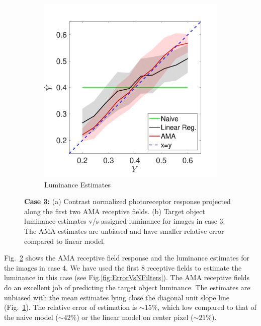 \documentclass{jov}
\begin{document}
\begin{figure}
\begin{subfigure}[b]{0.3 \textwidth}
        \includegraphics[width=\textwidth]{../Figures/Figure12/Figure12_b.pdf}
        \caption{Luminance Estimates}
        \label{fig:case12Results}
    \end{subfigure}
    \caption{{\bf Case 3:} (a) Contrast normalized photoreceptor response projected along the first two AMA receptive fields. (b) Target object luminance estimates v/s assigned luminance for images in case 3. The AMA estimates are unbiased and have smaller relative error compared to linear model.}
    \label{fig:case12AllResults}
\end{figure}

Fig.~\ref{fig:case12AllResults} shows the AMA receptive field response and the luminance estimates for the images in case 4. 
We have used the first 8 receptive fields to estimate the luminance in this case (see Fig.\ref{fig:ErrorVsNFilters}). 
The AMA receptive fields do an excellent job of predicting the target object luminance. The estimates are unbiased with the mean estimates lying close the diagonal unit slope line (Fig.~\ref{fig:case12Results}). 
The relative error of estimation is $\sim15\%$, which low compared to that of the naive model ($\sim42\%$) or the linear model on center pixel ($\sim21\%$).
\end{document}
